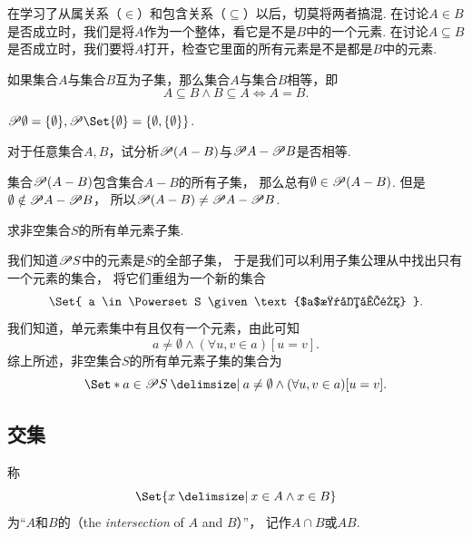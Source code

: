 在学习了从属关系（\(\in\)）和包含关系（\(\subseteq\)）以后，切莫将两者搞混.
在讨论\(A \in B\)是否成立时，我们是将\(A\)作为一个整体，看它是不是\(B\)中的一个元素.
在讨论\(A \subseteq B\)是否成立时，我们要将\(A\)打开，检查它里面的所有元素是不是都是\(B\)中的元素.

\begin{theorem}
如果集合\(A\)与集合\(B\)互为子集，那么集合\(A\)与集合\(B\)相等，即\begin{equation*}
	A \subseteq B \land B \subseteq A
	\iff
	A = B.
\end{equation*}
\end{theorem}

\begin{example}
\(\Powerset \emptyset = \{ \emptyset \},%
\Powerset \Set{ \emptyset } = \{ \emptyset, \{ \emptyset \} \}\).
\end{example}

\begin{example}
对于任意集合\(A,B\)，试分析\(\mathscr{P}(A-B)\)与\(\mathscr{P} A - \mathscr{P} B\)是否相等.
\begin{solution}
集合\(\mathscr{P}(A-B)\)包含集合\(A-B\)的所有子集，
那么总有\(\emptyset\in\mathscr{P}(A-B)\).
但是\(\emptyset\notin\mathscr{P} A - \mathscr{P} B\)，
所以\(\mathscr{P}(A-B) \neq \mathscr{P} A - \mathscr{P} B\).
\end{solution}
\end{example}

\begin{example}
求非空集合\(S\)的所有单元素子集.
\begin{solution}
我们知道\(\mathscr{P} S\)中的元素是\(S\)的全部子集，
于是我们可以利用子集公理从中找出只有一个元素的集合，
将它们重组为一个新的集合\begin{equation*}
	\Set{ a \in \Powerset S \given \text{$a$是单元集} }.
\end{equation*}
我们知道，单元素集中有且仅有一个元素，由此可知\begin{equation*}
	a \neq \emptyset
	\land
	(\forall u,v \in a)[u = v].
\end{equation*}
综上所述，非空集合\(S\)的所有单元素子集的集合为\begin{equation*}
	\Set*{
		a \in \Powerset S
		\given
		a \neq \emptyset
		\land
		(\forall u,v \in a)[u = v]
	}.
\end{equation*}
\end{solution}
\end{example}


\subsection{交集}
\begin{definition}
称\begin{equation*}
	\Set{ x \given x \in A \land x \in B }
\end{equation*}为“\(A\)和\(B\)的（the \emph{intersection} of \(A\) and \(B\)）”，
记作\(A \cap B\)或\(AB\).
\end{definition}

